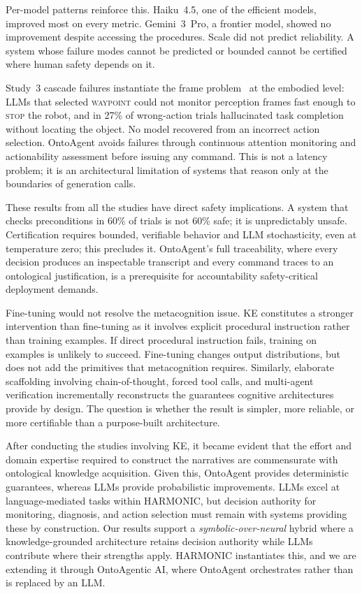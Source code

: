 \documentclass[letterpaper, 10 pt, conference]{ieeeconf}  %
\begin{document}
Per-model patterns reinforce this. Haiku~4.5, one of the 
efficient models, improved most on every metric. 
Gemini~3~Pro, a frontier model, showed no improvement 
despite accessing the procedures. Scale did not predict 
reliability. A system whose failure modes cannot be 
predicted or bounded cannot be certified where human 
safety depends on it.

Study~3 cascade failures instantiate the frame 
problem~\cite{mccarthy1981some} at the embodied level: 
LLMs that selected \textsc{waypoint} could not monitor 
perception frames fast enough to \textsc{stop} the robot, and in 27\% of wrong-action trials hallucinated task completion 
without locating the object. No model recovered from an 
incorrect action selection. OntoAgent avoids failures through continuous attention monitoring and actionability 
assessment before issuing any command. This is not a 
latency problem; it is an architectural limitation of 
systems that reason only at the boundaries of generation 
calls.

These results from all the studies have direct safety implications. A system that checks preconditions in 60\% of trials is not 60\% safe; it is unpredictably unsafe. Certification requires bounded, verifiable behavior and LLM stochasticity, even at temperature zero; this precludes it. OntoAgent's full traceability, where every decision produces an inspectable transcript and every command traces to an ontological justification, is a prerequisite for accountability safety-critical deployment demands.

Fine-tuning would not resolve the metacognition issue. KE constitutes a stronger intervention than fine-tuning as it involves explicit procedural instruction rather than training examples. If direct procedural instruction fails, training on examples is unlikely to succeed. Fine-tuning changes output distributions, but does not add the primitives that metacognition requires. Similarly, elaborate scaffolding involving chain-of-thought, forced tool calls, and multi-agent verification incrementally reconstructs the guarantees cognitive architectures provide by design. The question is whether the result is simpler, more reliable, or more certifiable than a purpose-built architecture.


After conducting the studies involving KE, it became evident that the effort and domain expertise required to construct the narratives are commensurate with ontological knowledge acquisition. Given this, OntoAgent provides deterministic guarantees, whereas LLMs provide probabilistic improvements. LLMs excel at language-mediated tasks within HARMONIC, but decision authority for monitoring, diagnosis, and action selection must remain with systems providing these by construction. Our results support a 
\textit{symbolic-over-neural} hybrid where a knowledge-grounded architecture retains decision authority while LLMs contribute where their strengths apply. HARMONIC instantiates this, and we are extending it through OntoAgentic AI, where OntoAgent orchestrates rather than is replaced by an LLM.
\end{document}
